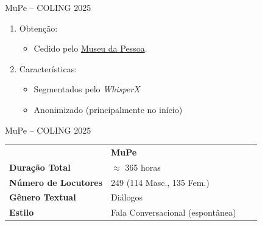 \begin{frame}{MuPe -- COLING 2025}
  \begin{block}{}
    \begin{enumerate}
      \item<-1> Obtenção:
        \begin{itemize}
          \item Cedido pelo
            \href{https://escuteaterra.museudapessoa.org/}{Museu da Pessoa}.
        \end{itemize}
      \item<2-> Características:
        \begin{itemize}
          \item Segmentados pelo \textit{WhisperX} \cite{whisperX}
          \item Anonimizado (principalmente no início)
        \end{itemize}
    \end{enumerate}
  \end{block}
\end{frame}

\begin{frame}{MuPe -- COLING 2025}
  \begin{block}{}
    \begin{table}[ht]
      \centering
      \label{tab:MuPe}
      \small
      \begin{tabular}{@{}llll@{}}
        & \textbf{MuPe} \\
        \textbf{Duração Total}  & $\approx$ 365 horas \\
        \textbf{Número de Locutores} & 249 (114 Masc., 135 Fem.) \\
        \textbf{Gênero Textual} & Diálogos \\
        \textbf{Estilo} & Fala Conversacional (espontânea)  \\
      \end{tabular}
    \end{table}
  \end{block}
\end{frame}

